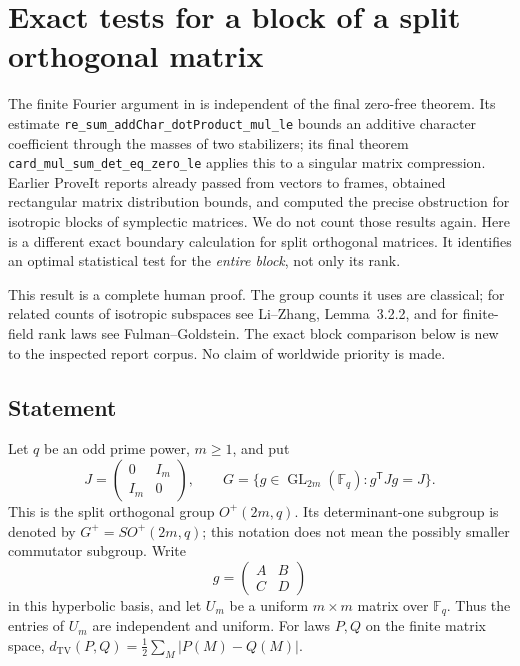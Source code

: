 \section{Exact tests for a block of a split orthogonal matrix}
\label{sec:orthogonal}

The finite Fourier argument in
is independent of the final zero-free theorem. Its estimate
\texttt{re\_sum\_addChar\_dotProduct\_mul\_le} bounds an additive character
coefficient through the masses of two stabilizers; its final theorem
\texttt{card\_mul\_sum\_det\_eq\_zero\_le} applies this to a singular
matrix compression. Earlier ProveIt reports already passed from vectors
to frames, obtained rectangular matrix distribution bounds, and computed
the precise obstruction for isotropic blocks of symplectic matrices.
We do not count those results again. Here is a different exact boundary
calculation for split orthogonal matrices. It identifies an optimal
statistical test for the \emph{entire block}, not only its rank.

This result is a complete human proof. The group counts it uses are
classical; for related counts of isotropic subspaces see Li--Zhang,
Lemma~3.2.2, and for finite-field rank laws see Fulman--Goldstein.\cite{lizhang,fulman}
The exact block comparison below is new to the inspected report corpus.
No claim of worldwide priority is made.

\subsection{Statement}

Let $q$ be an odd prime power, $m\ge1$, and put
\[
 J=\begin{pmatrix}0&I_m\\I_m&0\end{pmatrix},\qquad
 G=\{g\in\operatorname{GL}_{2m}(\mathbb F_q):g^{\mathsf T}Jg=J\}.
\]
This is the split orthogonal group $O^+(2m,q)$.
Its determinant-one subgroup is denoted by $G^+=SO^+(2m,q)$; this
notation does not mean the possibly smaller commutator subgroup.
Write
\[
 g=\begin{pmatrix}A&B\\C&D\end{pmatrix}
\]
in this hyperbolic basis, and let $U_m$ be a uniform $m\times m$ matrix
over $\mathbb F_q$. Thus the entries of $U_m$ are independent and uniform.
For laws $P,Q$ on the finite matrix space,
$d_{\mathrm{TV}}(P,Q)=\frac12\sum_M|P(M)-Q(M)|$.

